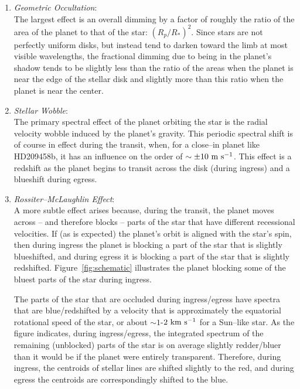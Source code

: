 \documentclass[12pt,preprint]{aastex}
\begin{document}
\begin{enumerate}
\label{list:transiteffects}
\item {\it Geometric Occultation}:\\
 The largest effect is an overall dimming by a factor of roughly the
ratio of the area of the planet to that of the star: $(R_p/R_*)^2$.  Since
stars are not perfectly uniform disks, but instead tend to darken toward
the limb at most visible wavelengths, the fractional dimming due to being
in the planet's shadow tends to be slightly less than the ratio of the
areas when the planet is near the edge of the stellar disk and slightly
more than this ratio when the planet is near the center.
\item {\it Stellar Wobble}:\\
 The primary spectral effect of the planet orbiting the star is the radial
velocity wobble induced by the planet's gravity.  This periodic spectral
shift is of course in effect during the transit, when, for a close--in planet
like HD209458b, it has an influence on the order of
$\sim \pm 10 {\rm ~m~s^{-1}}$.
This effect is a redshift as the planet begins to transit across the disk
(during ingress) and a blueshift during egress.
\item {\it Rossiter--McLaughlin Effect}:\\
 A more subtle effect arises because, during the transit, the planet moves
across -- and therefore blocks -- parts of the star that have different
recessional velocities.  If (as is expected) the planet's orbit is aligned
with the star's spin, then during ingress the planet is blocking a part of
the star that is slightly blueshifted, and during egress it is blocking a part
of the star that is slightly redshifted.  Figure~\ref{fig:schematic}
illustrates the planet blocking some of the bluest parts of the star
during ingress.

The parts of the star that are occluded during ingress/egress have spectra
that are blue/redshifted by a velocity that is approximately the equatorial
rotational speed of the star, or about $\sim 1$-$2 {\rm ~km~s^{-1}}$ for a
Sun--like star.
As the figure indicates, during ingress/egress, the integrated
spectrum of the remaining (unblocked) parts of the star is on average slightly
redder/bluer than it would be if the planet were entirely transparent.
Therefore, during ingress, the centroids of stellar lines are shifted
slightly to the red, and during egress the centroids are correspondingly
shifted to the blue.


\end{enumerate}
\end{document}
